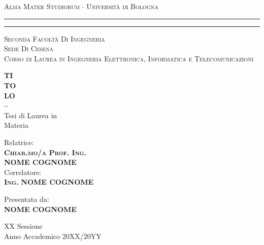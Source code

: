 \begin{titlepage}
    \begin{center}
    {{\Large{\textsc{Alma Mater Studiorum $\cdot$ Universit\`a di
    Bologna}}}} \rule[0.1cm]{15.8cm}{0.1mm}
    \rule[0.5cm]{15.8cm}{0.6mm}
    {\small{\textsc { Seconda Facolt\`a Di Ingegneria \\ 
    Sede Di Cesena\\
    \vspace{5mm}
    Corso di Laurea in Ingegneria Elettronica, Informatica e Telecomunicazioni}}}
    \end{center}
    \vspace{15mm}
    \begin{center}
    {\LARGE\textbf{TI}}\\
    \vspace{3mm}
    {\LARGE{\bf TO}}\\
    \vspace{3mm}
    {\LARGE{\bf LO}}\\
    \vspace{3mm}
    {\LARGE{\bf --}}\\
    \vspace{15mm} {\large{\sc Tesi di Laurea in 
    \\ Materia}}
    \end{center}
    \vfill
    \par
    \noindent
    \begin{minipage}[t]{0.47\textwidth}
    {\large{\sc Relatrice:}\\
    {\bf \textsc{Chiar.mo/a Prof. Ing.\\
     NOME COGNOME}}}\\
    \vskip 8pt
    {\large{\sc Correlatore:}\\
    {\bf \textsc{Ing.}}
    {\bf NOME COGNOME}}
    \end{minipage}
    \hfill
    \begin{minipage}[t]{0.47\textwidth}\raggedleft
    {\large{\sc Presentata da:}\\
    {\bf NOME COGNOME}}
    \end{minipage}
    \vspace{20mm}
    \begin{center}
    {\large{\sc XX Sessione\\%
    Anno Accademico 20XX/20YY}}%
    \end{center}
    \end{titlepage}